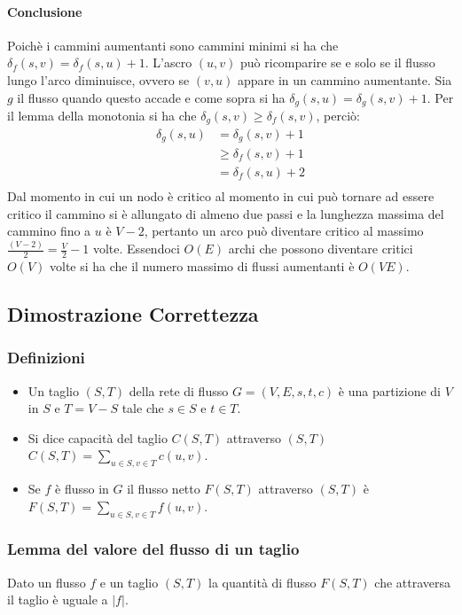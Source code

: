 \paragraph{Conclusione}
Poich\`e i cammini aumentanti sono cammini minimi si ha che $\delta_f(s, v) = \delta_f(s, u)+1$. L'ascro $(u, v)$ pu\`o ricomparire se e solo se il flusso lungo l'arco diminuisce, ovvero
se $(v, u)$ appare in un cammino aumentante. Sia $g$ il flusso quando questo accade e come sopra si ha $\delta_g(s, u) = \delta_g(s, v)+1$. Per il lemma della monotonia si ha che
$\delta_g(s, v)\ge \delta_f(s, v)$, perci\`o:
\begin{align*}
	\delta_g(s, u) & = \delta_g(s, v)+1\\
		       & \ge \delta_f(s, v)+1\\
		       & = \delta_f(s, u)+2\\
\end{align*}
Dal momento in cui un nodo \`e critico al momento in cui pu\`o tornare ad essere critico il cammino si \`e allungato di almeno due passi e la lunghezza massima del cammino fino a $u$ \`e
$V-2$, pertanto un arco pu\`o diventare critico al massimo $\frac{(V-2)}{2}=\frac{V}{2}-1$ volte. Essendoci $O(E)$ archi che possono diventare critici $O(V)$ volte si ha che il numero
massimo di flussi aumentanti \`e $O(VE)$.
\subsection{Dimostrazione Correttezza}
\subsubsection{Definizioni}
\begin{itemize}
	\item Un taglio $(S, T)$ della rete di flusso $G=(V, E, s, t, c)$ \`e una partizione di $V$ in $S$ e $T=V-S$ tale che $s\in S$ e $t\in T$. 
	\item Si dice capacit\`a del taglio $C(S, T)$ attraverso $(S, T)$ $C(S, T) = \sum\limits_{u\in S, v\in T}c(u, v)$.
	\item Se $f$ \`e flusso in $G$ il flusso netto $F(S, T)$ attraverso $(S, T)$ \`e $F(S, T) = \sum\limits_{u\in S, v\in T} f(u, v)$.
\end{itemize}
\subsubsection{Lemma del valore del flusso di un taglio}
Dato un flusso $f$ e un taglio $(S, T)$ la quantit\`a di flusso $F(S, T)$ che attraversa il taglio \`e uguale a $|f|$. 
